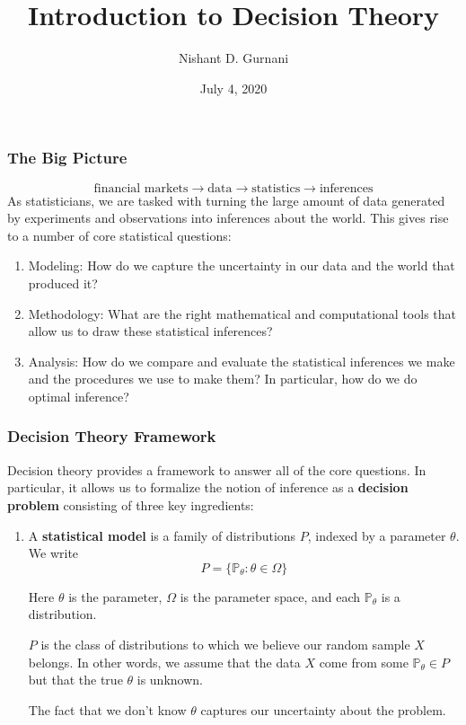 \documentclass[10pt]{beamer}
\title[Statistical Decision Theory]{Introduction to Decision Theory}
\author{Nishant D. Gurnani}
\date{July 4, 2020}
\begin{document}
\begin{frame}
\titlepage	
\end{frame}


\begin{frame}
\frametitle{The Big Picture}
$$\text{financial markets} \rightarrow \text{data} \rightarrow \text{statistics} \rightarrow \text{inferences}$$
\newline 
As statisticians, we are tasked with turning the large amount of data generated by experiments and observations into inferences about the world.
\newline
\newline
This gives rise to a number of core statistical questions:
\newline

\begin{enumerate}

\item{Modeling: How do we capture the uncertainty in our data and the world that produced it?}
\newline
\item{Methodology: What are the right mathematical and computational tools that allow us to draw these statistical inferences?}
\newline
\item{Analysis: How do we compare and evaluate the statistical inferences we make and the procedures we use to make them? In particular, how do we do optimal inference?}	
\newline
\end{enumerate}

\end{frame}

\begin{frame}
\frametitle{Decision Theory Framework}
Decision theory provides a framework to answer all of the core questions.
\newline
In particular, it allows us to formalize the notion of inference as a \textbf{decision problem} consisting of three key ingredients:
\newline
\begin{enumerate}
\item{A \textbf{statistical model} is a family of distributions $P$, indexed by a parameter $\theta$. We write $$ P = \{\mathbb{P}_{\theta} : \theta \in \Omega\}$$}

Here $\theta$ is the parameter, $\Omega$ is the parameter space, and each $\mathbb{P}_{\theta}$ is a distribution.\newline

$P$ is the class of distributions to which we believe our random sample $X$ belongs. In other words, we assume that the data $X$ come from some $\mathbb{P}_{\theta} \in P$ but that the true $\theta$ is unknown. \newline 

The fact that we don't know $\theta$ captures our uncertainty about the problem.    
 
\end{enumerate}
\end{frame}
\end{document}

